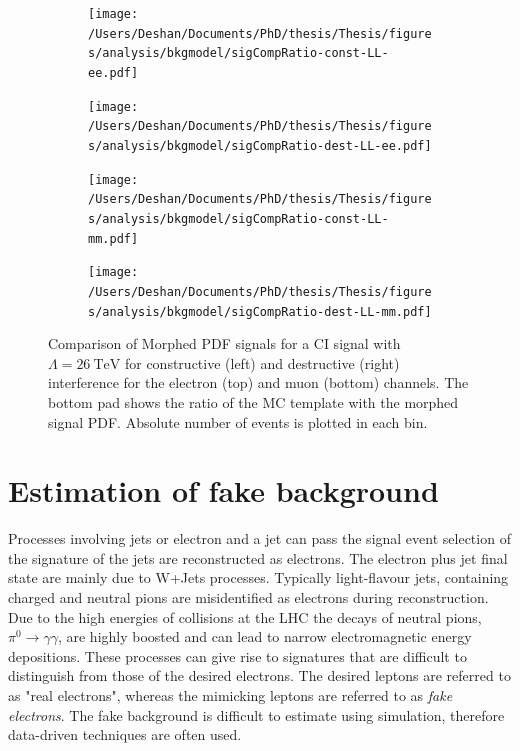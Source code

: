 \begin{figure}[h!]
    \centering
    \begin{subfigure}[b]{0.49\textwidth}
        \centering
        \texttt{[image: /Users/Deshan/Documents/PhD/thesis/Thesis/figures/analysis/bkgmodel/sigCompRatio-const-LL-ee.pdf]}
        \label{fig:bkgmodel:ratioMorphee1}
    \end{subfigure}
    \begin{subfigure}[b]{0.49\textwidth}
        \centering
        \texttt{[image: /Users/Deshan/Documents/PhD/thesis/Thesis/figures/analysis/bkgmodel/sigCompRatio-dest-LL-ee.pdf]}
        \label{fig:bkgmodel:ratioMorphee2}
    \end{subfigure}
    \begin{subfigure}[b]{0.49\textwidth}
        \centering
        \texttt{[image: /Users/Deshan/Documents/PhD/thesis/Thesis/figures/analysis/bkgmodel/sigCompRatio-const-LL-mm.pdf]}
        \label{fig:bkgmodel:ratioMorphmm1}
    \end{subfigure}
    \begin{subfigure}[b]{0.49\textwidth}
        \centering
        \texttt{[image: /Users/Deshan/Documents/PhD/thesis/Thesis/figures/analysis/bkgmodel/sigCompRatio-dest-LL-mm.pdf]}
        \label{fig:bkgmodel:ratioMorphmm2}
    \end{subfigure}
    \caption[Comparison of morphed signal PDF with generated signal template]{Comparison of Morphed PDF signals for a CI signal with $\Lambda = \SI{26}{\tera\electronvolt}$ for constructive (left) and destructive (right) interference for the electron (top) and muon (bottom) channels. The bottom pad shows the ratio of the MC template with the morphed signal PDF. Absolute number of events is plotted in each bin.}
    \label{fig:bkgmodel:ratioMorph}
\end{figure}

\section{Estimation of fake background}\label{sec:datamc:fakes}
Processes involving jets or electron and a jet can pass the signal event selection of the signature of the jets are reconstructed as electrons. The electron plus jet final state are mainly due to W+Jets processes. Typically light-flavour jets, containing charged and neutral pions are misidentified as electrons during reconstruction. Due to the high energies of collisions at the LHC the decays of neutral pions, $\pi^0 \rightarrow \gamma\gamma$, are highly boosted and can lead to narrow electromagnetic energy depositions. These processes can give rise to signatures that are difficult to distinguish from those of the desired electrons. The desired leptons are referred to as "real electrons", whereas the mimicking leptons are referred to as \emph{fake electrons}. The fake background is difficult to estimate using simulation, therefore data-driven techniques are often used. 

